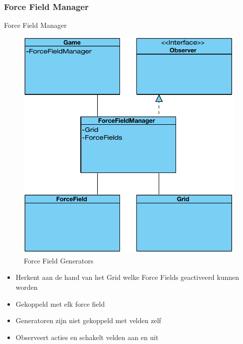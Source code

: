 \documentclass[t]{beamer}
\begin{document}
\subsubsection{Force Field Manager}
\begin{frame}{Force Field Manager}
\begin{multicols}{2}
\begin{figure}
	\center
	\includegraphics[width= 0.9\linewidth]{img/forcefieldmanager.pdf}
	\caption{Force Field Generators}
\end{figure}

\begin{itemize}
	\item Herkent aan de hand van het Grid welke Force Fields geactiveerd kunnen worden
	\item Gekoppeld met elk force field
	\item Generatoren zijn niet gekoppeld met velden zelf
	\item Observeert acties en schakelt velden aan en uit
\end{itemize}
\end{multicols}
\end{frame}
\end{document}
